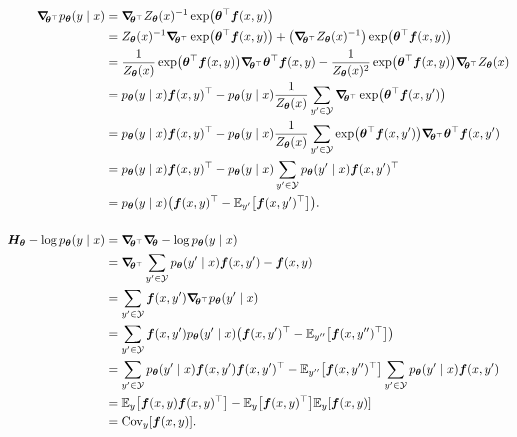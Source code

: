 \begin{align*}
  \grad{p_{\vec{\theta}}(y\mid x)}{\transpose{\vec{\theta}}} &= \grad{Z_{\vec{\theta}}(x)^{-1} \exp \lft( \transpose{\vec{\theta}} \vec{f}(x,y) \rgt)}{\transpose{\vec{\theta}}} \\
  &= Z_{\vec{\theta}}(x)^{-1} \grad{\exp \lft( \transpose{\vec{\theta}} \vec{f}(x,y) \rgt)}{\transpose{\vec{\theta}}} + \lft( \grad{Z_{\vec{\theta}}(x)^{-1}}{\transpose{\vec{\theta}}} \rgt) \exp \lft( \transpose{\vec{\theta}} \vec{f}(x,y) \rgt) \\
  &= \frac{1}{Z_{\vec{\theta}}(x)} \exp \lft( \transpose{\vec{\theta}} \vec{f}(x,y) \rgt) \grad{\transpose{\vec{\theta}} \vec{f}(x,y)}{\transpose{\vec{\theta}}} - \frac{1}{Z_{\vec{\theta}}(x)^2} \exp \lft( \transpose{\vec{\theta}} \vec{f}(x,y) \rgt) \grad{Z_{\vec{\theta}}(x)}{\transpose{\vec{\theta}}} \\
  &= p_{\vec{\theta}}(y\mid x) \transpose{\vec{f}(x,y)} - p_{\vec{\theta}}(y\mid x) \frac{1}{Z_{\vec{\theta}}(x)} \sum_{y'\in\mathcal{Y}} \grad{\exp \lft( \transpose{\vec{\theta}} \vec{f}(x,y') \rgt)}{\transpose{\vec{\theta}}} \\
  &= p_{\vec{\theta}}(y\mid x) \transpose{\vec{f}(x,y)} - p_{\vec{\theta}}(y\mid x) \frac{1}{Z_{\vec{\theta}}(x)} \sum_{y'\in\mathcal{Y}} \exp \lft( \transpose{\vec{\theta}} \vec{f}(x,y') \rgt) \grad{\transpose{\vec{\theta}} \vec{f}(x,y')}{\transpose{\vec{\theta}}} \\
  &= p_{\vec{\theta}}(y\mid x) \transpose{\vec{f}(x,y)} - p_{\vec{\theta}}(y\mid x) \sum_{y'\in\mathcal{Y}} p_{\vec{\theta}}(y'\mid x) \transpose{\vec{f}(x,y')} \\
  &= p_{\vec{\theta}}(y\mid x) \lft( \transpose{\vec{f}(x,y)} - \E_{y'} \lft[ \transpose{\vec{f}(x,y')} \rgt] \rgt). \\
  \\
  \hess{-\log p_{\vec{\theta}}(y\mid x)}{\vec{\theta}} &= \grad{ \grad{-\log p_{\vec{\theta}}(y\mid x)}{\vec{\theta}} }{\transpose{\vec{\theta}}} \\
  &= \grad{\sum_{y'\in\mathcal{Y}} p_{\vec{\theta}}(y'\mid x) \vec{f}(x,y') - \vec{f}(x,y)}{\transpose{\vec{\theta}}} \\
  &= \sum_{y'\in\mathcal{Y}} \vec{f}(x,y') \grad{p_{\vec{\theta}}(y'\mid x)}{\transpose{\vec{\theta}}} \\
  &= \sum_{y'\in\mathcal{Y}} \vec{f}(x,y') p_{\vec{\theta}}(y'\mid x) \lft( \transpose{\vec{f}(x,y')} - \E_{y''} \lft[ \transpose{\vec{f}(x,y'')} \rgt] \rgt) \\
  &= \sum_{y'\in\mathcal{Y}} p_{\vec{\theta}}(y'\mid x) \vec{f}(x,y') \transpose{\vec{f}(x,y')}  - \E_{y''} \lft[ \transpose{\vec{f}(x,y'')} \rgt] \sum_{y'\in\mathcal{Y}} p_{\vec{\theta}}(y'\mid x) \vec{f}(x,y') \\
  &= \E_y \lft[ \vec{f}(x,y) \transpose{\vec{f}(x,y)} \rgt]  - \E_y \lft[ \transpose{\vec{f}(x,y)} \rgt] \E_y \lft[ \vec{f}(x,y) \rgt] \\
  &= \mathrm{Cov}_y \lft[ \vec{f}(x,y) \rgt]
.\end{align*}


